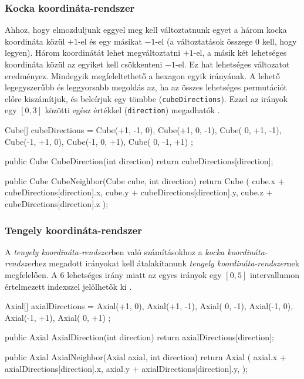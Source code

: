 \subsubsection{Kocka koordináta-rendszer}

Ahhoz, hogy elmozduljunk eggyel meg kell változtatnunk egyet a három kocka koordináta közül $+1$-el és egy másikat $-1$-el (a változtatások összege $0$ kell, hogy legyen). Három koordinátát lehet megváltoztatni $+1$-el, a másik két lehetséges koordináta közül az egyiket kell csökkenteni $-1$-el. Ez hat lehetséges változatot eredményez. Mindegyik megfeleltethető a hexagon egyik irányának. A lehető legegyszerűbb és leggyorsabb megoldás az, ha az összes lehetséges permutációt előre kiszámítjuk, és beleírjuk egy tömbbe (\texttt{cubeDirections}). Ezzel az irányok egy $[0, 3]$ közötti egész értékkel (\texttt{direction}) megadhatók \cite{Neighbors_Cube}.
\begin{cpp}
Cube[] cubeDirections = 
{ 
   Cube(+1, -1,  0), Cube(+1,  0, -1), Cube( 0, +1, -1),
   Cube(-1, +1,  0), Cube(-1,  0, +1), Cube( 0, -1, +1) 
};

public Cube CubeDirection(int direction)
{
   return cubeDirections[direction];
}

public Cube CubeNeighbor(Cube cube, int direction)
{
   return Cube
   (
      cube.x + cubeDirections[direction].x, 
      cube.y + cubeDirections[direction].y, 
      cube.z + cubeDirections[direction].z
   );
}
\end{cpp}

\subsubsection{Tengely koordináta-rendszer}

\noindent A \textit{tengely koordináta-rendszer}ben való számításokhoz a \textit{kocka koordináta-rendszer}hez megadott irányokat kell átalakítanunk \textit{tengely koordináta-rendszer}nek megfelelően. A 6 lehetséges irány miatt az egyes irányok egy $[0, 5]$ intervallumon értelmezett indexszel jelölhetők ki \cite{Neighbors_Axial}.
\begin{cpp}
Axial[] axialDirections = 
{ 
   Axial(+1,  0), Axial(+1, -1), Axial( 0, -1),
   Axial(-1,  0), Axial(-1, +1), Axial( 0, +1)
};

public Axial AxialDirection(int direction)
{
   return axialDirections[direction];
}

public Axial AxialNeighbor(Axial axial, int direction)
{
   return Axial
   (
      axial.x + axialDirections[direction].x, 
      axial.y + axialDirections[direction].y, 
   );
}
\end{cpp}

